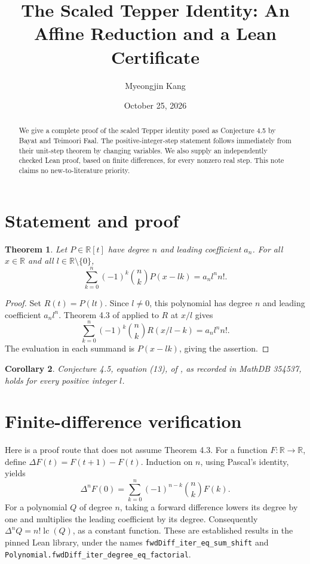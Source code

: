 \documentclass[11pt]{article}
\title{The Scaled Tepper Identity: An Affine Reduction and a Lean Certificate}
\author{Myeongjin Kang}
\date{October 25, 2026}
\newtheorem{theorem}{Theorem}
\newtheorem{corollary}[theorem]{Corollary}
\begin{document}
\maketitle
\begin{abstract}
We give a complete proof of the scaled Tepper identity posed as Conjecture 4.5 by Bayat and Teimoori Faal. The positive-integer-step statement follows immediately from their unit-step theorem by changing variables. We also supply an independently checked Lean proof, based on finite differences, for every nonzero real step. This note claims no new-to-literature priority.
\end{abstract}
\section{Statement and proof}
\begin{theorem}\label{thm:main}
Let $P\in\mathbb R[t]$ have degree $n$ and leading coefficient $a_n$. For all $x\in\mathbb R$ and all $l\in\mathbb R\setminus\{0\}$,
\[
\sum_{k=0}^n(-1)^k\binom nkP(x-lk)=a_n l^n n!.
\]
\end{theorem}
\begin{proof}
Set $R(t)=P(lt)$. Since $l\ne0$, this polynomial has degree $n$ and leading coefficient $a_nl^n$. Theorem 4.3 of \cite{BT} applied to $R$ at $x/l$ gives
\[
\sum_{k=0}^n(-1)^k\binom nkR(x/l-k)=a_nl^nn!.
\]
The evaluation in each summand is $P(x-lk)$, giving the assertion.
\end{proof}
\begin{corollary}
Conjecture 4.5, equation (13), of \cite{BT}, as recorded in MathDB 354537, holds for every positive integer $l$.
\end{corollary}
\section{Finite-difference verification}
Here is a proof route that does not assume Theorem 4.3. For a function $F:\mathbb R\to\mathbb R$, define $\Delta F(t)=F(t+1)-F(t)$. Induction on $n$, using Pascal's identity, yields
\[
\Delta^nF(0)=\sum_{k=0}^n(-1)^{n-k}\binom nk F(k).
\]
For a polynomial $Q$ of degree $n$, taking a forward difference lowers its degree by one and multiplies the leading coefficient by its degree. Consequently $\Delta^nQ=n!\operatorname{lc}(Q)$, as a constant function. These are established results in the pinned Lean library, under the names \texttt{fwdDiff\_iter\_eq\_sum\_shift} and \texttt{Polynomial.fwdDiff\_iter\_degree\_eq\_factorial}.
\end{document}
